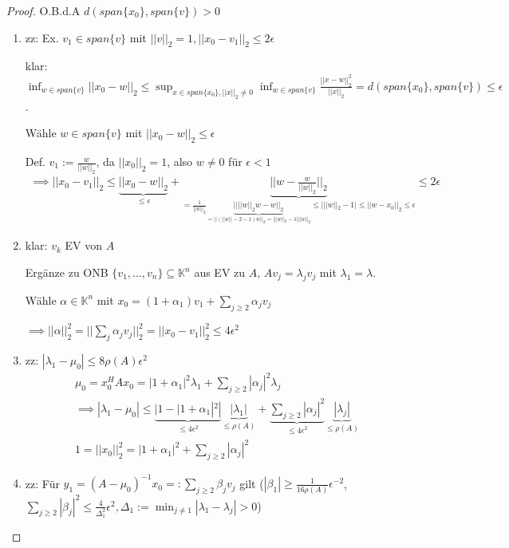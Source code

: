 \begin{proof}
	O.B.d.A $d(span\{x_0\}, span\{v\}) > 0$
	
	\begin{enumerate}
		\item zz: Ex. $v_1 \in span\{v\}$ mit $||v||_2 = 1, ||x_0 - v_1||_2 \leq 2\epsilon$
		
		klar: $\inf_{w \in span\{v\}} ||x_0 - w||_2 \leq \sup_{x \in span\{x_0\}, ||x||_2 \neq 0} \inf_{w \in span\{v\}} \frac{||x-w||_2^2}{||x||_2} = d(span\{x_0\}, span\{v\}) \leq \epsilon$.
		
		Wähle $w \in span\{v\}$ mit $||x_0 - w||_2 \leq \epsilon$
		
		Def. $v_1:= \frac{w}{||w||_2}$, da $||x_0||_2 = 1$, also $w\neq 0$ für $\epsilon < 1$
		\begin{align*}
			\implies ||x_0 - v_1||_2 \leq \underbrace{||x_0 - w||_2}_{\leq \epsilon} + \underbrace{||w - \frac{w}{||w||_2}||_2}_{= \frac{1}{||w||_2} \underbrace{|| ||w||_2 w - w||_2}_{= ||(||w||-2 - 1)w||_2 = | ||w||_2 - 1| ||w||_2} \leq | ||w||_2 - 1| \leq ||w-x_0||_2 \leq \epsilon} \leq 2 \epsilon
		\end{align*}
		
		\item klar: $v_k$ EV von $A$
		
		Ergänze zu ONB $\{v_1, ..., v_n\} \subseteq \mathbb{K}^n$ aus EV zu $A$, $Av_j = \lambda_j v_j$ mit $\lambda_1 = \lambda$.
		
		Wähle $\alpha \in \mathbb{K}^n$ mit $x_0 = (1+\alpha_1)v_1 + \sum_{j\geq 2}\alpha_j v_j$
		
		$\implies ||\alpha||_2^2 = ||\sum_{j} \alpha_j v_j||_2^2 = ||x_0 - v_1||_2^2 \leq 4 \epsilon^2$
		
		\item zz: $|\lambda_1 - \mu_0| \leq 8 \rho(A) \epsilon^2$
		\begin{align*}
			\mu_0 = x_0^HAx_0 = |1+\alpha_1|^2 \lambda_1 + \sum_{j\geq 2} |\alpha_j|^2 \lambda_j\\
			\implies |\lambda_1 - \mu_0| \leq \underbrace{|1 - |1+\alpha_1|^2|}_{\leq 4 \epsilon^2} \underbrace{|\lambda_1|}_{\leq \rho(A)} + \underbrace{\sum_{j\geq2} |\alpha_j|^2}_{\leq 4 \epsilon^2} \underbrace{|\lambda_j|}_{\leq \rho(A)}\\
			1 = ||x_0||_2^2 = |1+\alpha_1|^2 + \sum_{j\geq 2} |\alpha_j|^2
		\end{align*}
		
		\item zz: Für $y_1 = (A - \mu_0)^{-1}x_0 =: \sum_{j\geq 2} \beta_j v_j$ gilt ($|\beta_1| \geq \frac{1}{16\rho(A)}\epsilon^{-2}$, 		
		$\sum_{j\geq 2} |\beta_j|^2 \leq \frac{4}{\Delta_1^2} \epsilon^2, \Delta_1 := \min_{j\neq 1} |\lambda_1 - \lambda_j| > 0$)
		

\end{enumerate}
\end{proof}
